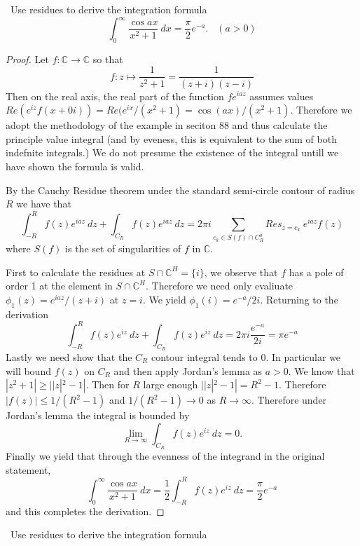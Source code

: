 \documentclass[11pt]{amsart}
\theoremstyle{definition}
\numberwithin{theorem}{section}
\numberwithin{definition}{section}
\numberwithin{equation}{section}
\begin{document}
\medskip {}\ Use residues to derive the integration formula
\begin{equation*}
	\int_0^\infty \frac{\cos ax}{x^2 + 1}\ dx = \frac{\pi}{2}e^{-a}. \;\;\;(a > 0)
\end{equation*}
\begin{proof}
		Let $f: \mathbb{C} \to \mathbb{C}$ so that 
	\begin{equation*}
		f: z \mapsto \frac{1}{z^2 + 1} = \frac{1}{(z+i)(z-i)}
	\end{equation*}
	Then on the real axis, the real part of the  function $fe^{iaz}$ assumes values $Re(e^{iz}f(x + 0i)) = Re(e^{ix}/(x^2 + 1) = \cos(ax)/(x^2 + 1)$. Therefore we adopt the methodology of the example in seciton 88 and thus calculate the principle value integral (and by eveness, this is equivalent to the sum of both indefnite integrals.) We do not presume the existence of the integral untill we have shown the formula is valid.

	By the Cauchy Residue theorem under the standard semi-circle contour of radius $R$ we have that
	\begin{equation*}
		\int_{-R}^R f(z)e^{iaz}\ dz + \int_{C_R} f(z) e^{iaz}\ dz = 2\pi i \sum_{c_k \in S(f) \cap C_R^o} Res_{z=c_k}\ e^{iaz} f(z)
	\end{equation*}
	where $S(f)$ is the set of singularities of $f$ in $\mathbb{C}.$

	First to calculate the residues at $S \cap \mathbb{C}^H = \{i\}$, we observe that $f$ has a pole of order 1 at the element in $S \cap \mathbb{C}^H$. Therefore we need only evaliuate $\phi_1(z) = e^{iaz}/(z + i)$ at $z = i$. We yield $\phi_1(i) = e^{-a}/2i.$ Returning to the derivation
	\begin{equation*}
		\int_{-R}^R f(z)e^{iz}\ dz + \int_{C_R} f(z) e^{iz}\ dz = 2\pi i \frac{e^{-a}}{2i} = \pi e^{-a}
	\end{equation*}
	Lastly we need show that the $C_R$ contour integral tends to $0$.  In particular we will  bound $f(z)$ on $C_R$
	and then apply Jordan's lemma as $a > 0$.  We know that $|z^2 + 1| \geq ||z|^2 - 1|.$ Then for $R$ large enough $||z|^2 - 1| = R^2 - 1.$
	Therefore $|f(z)| \leq 1/(R^2 - 1)$ and $1/(R^2 - 1) \to 0$ as $R \to \infty.$
	Therefore under Jordan's lemma the integral is bounded by
	\begin{equation*}
		\lim_{R \to \infty} \int_{C_R} f(z) e^{iz}\ dz = 0.
	\end{equation*}
	Finally we yield that through the evenness of the integrand in the original statement,
	\begin{equation*}
		\int_0^\infty \frac{\cos ax}{x^2 + 1}\ dx = \frac{1}{2}  \int_{-R}^R f(z)e^{iz}\ dz = \frac{\pi}{2} e^{-a}
	\end{equation*}
	and this completes the derivation.
\end{proof}

\medskip {}\ Use residues to derive the integration formula
\begin{equation*}

\end{equation*}

\medskip {}\ 
\medskip {}\ 
\medskip {}\ 
\medskip {}\ 
\medskip {}\ 
\end{document}
